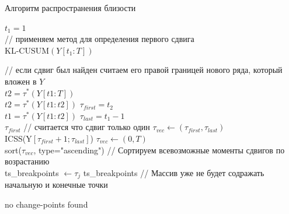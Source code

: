 \documentclass[a4paper,14pt,russian]{extarticle}
\begin{document}
	\begin{algorithm}
		\caption{\label{alg:alg1}Алгоритм распространения близости}
		\SetAlgoLined
		{
			$t_1 = 1$ \\
			// применяем метод для определения первого сдвига \\
			KL-CUSUM$( Y \left[ t_1: T \right] )$ \\
			{
				// если сдвиг был найден считаем его правой границей нового ряда, который вложен в $Y$ \\
				$t2 = \tau^*(Y \left[t1:T\right])$ \\
				{
					$t2 = \tau^*(Y \left[t1:t2\right])$
				}
				$\tau_{first} = t_2$ \\
				{
					$t1 = \tau^*(Y \left[t1:t2\right])$
				}
				$\tau_{last} = t_1 - 1$ \\
				{
					\Return $\tau_{first}$ // считается что сдвиг только один
				}
				{
					$\tau_{vec} \longleftarrow \left(\tau_{first}, \tau_{last}\right)$ \\
					ICSS(Y$\left[\tau_{first} + 1; \tau_{last}\right]$)
				}
				{
					$\tau_{vec} \longleftarrow \left(0, T\right)$ \\
					sort($\tau_{vec}$, type="ascending") // Сортируем всевозможные моменты сдвигов по возрастанию \\
					{
						{
							ts\_breakpoints $\longleftarrow \tau_j$
						}
					}
					\Return ts\_breakpoints // Массив уже не будет содражать начальную и конечные точки \\
				}
				
				
			}{\Return no change-points found}	
		}
		
	\end{algorithm}
	
	\clearpage
\end{document}
